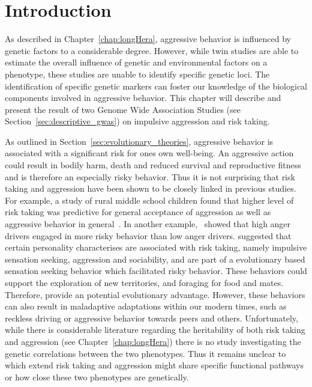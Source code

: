 \section{Introduction}
\label{sec:introduction}

As described in Chapter~\ref{chap:longHera}, aggressive behavior is influenced by genetic factors to a considerable degree.
However, while twin studies are able to estimate the overall influence of genetic and environmental factors on a phenotype, these studies are unable to identify specific genetic loci.
The identification of specific genetic markers can foster our knowledge of the biological components involved in aggressive behavior. 
This chapter will describe and present the result of two Genome Wide Association Studies (see Section~\ref{sec:descriptive_gwas}) on impulsive aggression and risk taking.

As outlined in Section~\ref{sec:evolutionary_theories}, aggressive behavior is associated with a significant risk for ones own well-being.
An aggressive action could result in bodily harm, death and reduced survival and reproductive fitness and is therefore an especially risky behavior.
Thus it is not surprising that risk taking and aggression have been shown to be closely linked in previous studies.
For example, a study of rural middle school children found that higher level of risk taking was  predictive for general acceptance of aggression as well as aggressive behavior in general~\cite{Swaim2004}.
In another example,~\citet{Deffenbacher2003} showed that high anger drivers engaged in more risky behavior than low anger drivers.
\citet{Zuckerman2000} suggested that certain personality characterises are associated with risk taking, namely impulsive sensation seeking, aggression and sociability, and are part of a evolutionary based sensation seeking behavior which facilitated risky behavior.
These behaviors could support the exploration of new territories, and foraging for food and mates.
Therefore, provide an potential evolutionary advantage.
However, these behaviors can also result in maladaptive adaptations within our modern times, such as reckless driving or aggressive behavior towards peers and others.
Unfortunately, while there is considerable literature regarding the heritability of both risk taking and aggression (see Chapter~\ref{chap:longHera}) there is no study investigating the genetic correlations between the two phenotypes.
Thus it remains unclear to which extend risk taking and aggression might share specific functional pathways or how close these two phenotypes are genetically.

